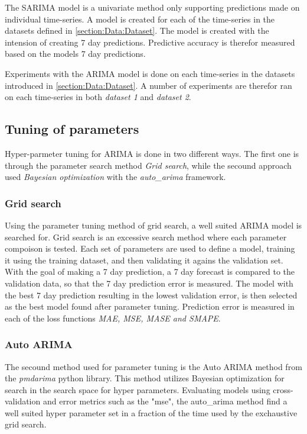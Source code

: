 \iffalse
  The SARIMA model is a univariate method only supporting predictions made on individual time-series.
  A model is created for each of the time-series in the datasets defined in \cref{section:Data:Dataset}.
  The model is created with the intension of creating 7 day predictions.
  Predictive accuracy is therefor measured based on the models 7 day predictions.

  Experiments with the ARIMA model is done on each time-series in the datasets introduced in \cref{section:Data:Dataset}.
  A number of experiments are therefor ran on each time-series in both \textit{dataset 1} and \textit{dataset 2}.


  \iffalse
    ARIMA models are first tuned on each time-series in order to make predicitons.
    The hyper-parmeters fond after the tuning is then used in order to created models capable of making predictions.
    The model attempts to make a 7 day ahead prediction.
  \fi

  \subsection{Tuning of parameters}
  Hyper-parmeter tuning for ARIMA is done in two different ways.
  The first one is through the parameter search method \textit{Grid search},
  while the secound approach used \textit{Bayesian optimization} with the \textit{auto\_arima} framework.

  \subsubsection*{Grid search}
  Using the parameter tuning method of grid search, a well suited ARIMA model is searched for.
  Grid search is an excessive search method where each parameter compoison is tested.
  Each set of parameters are  used to define a model, training it using the training dataset,
  and then validating it agains the validation set.
  With the goal of making a 7 day prediction, a 7 day forecast is compared to the validation data,
  so that the 7 day prediction error is measured.
  The model with the best 7 day prediction resulting in the lowest validation error,
  is then selected as the best model found after parameter tuning.
  Prediction error is measured in each of the loss functions \textit{MAE, MSE, MASE and SMAPE}.

  \subsubsection{Auto ARIMA}
  The secound method used for parameter tuning is the Auto ARIMA method from the \textit{pmdarima} python library.
  This method utilizes Bayesian optimization for search in the search space for hyper parameters.
  Evaluating models using cross-validation and error metrics such as the "mse",
  the auto\_arima method find a well suited hyper parameter set in a fraction of the time used by the exchaustive grid search.

